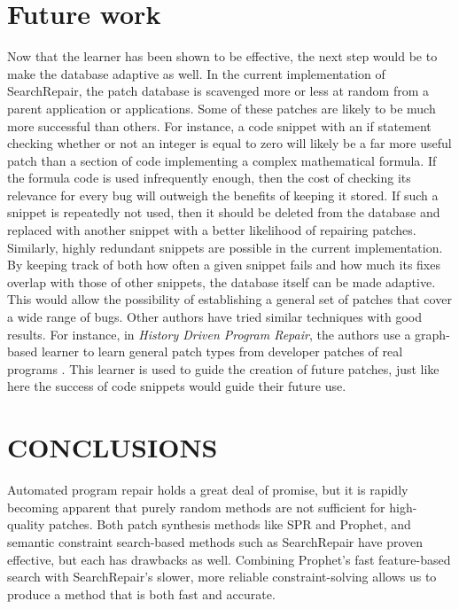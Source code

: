 \documentclass{paper}
\begin{document}
\section{Future work}

Now that the learner has been shown to be effective, the next step would be to make the database adaptive as well. 
In the current implementation of SearchRepair, the patch database is scavenged more or less at random from a parent application or applications. 
Some of these patches are likely to be much more successful than others. 
For instance, a code snippet with an if statement checking whether or not an integer is equal to zero will likely be a far more useful patch than a section of code implementing a complex mathematical formula. 
If the formula code is used infrequently enough, then the cost of checking its relevance for every bug will outweigh the benefits of keeping it stored. 
If such a snippet is repeatedly not used, then it should be deleted from the database and replaced with another snippet with a better likelihood of repairing patches. 
Similarly, highly redundant snippets are possible in the current implementation. 
By keeping track of both how often a given snippet fails and how much its fixes overlap with those of other snippets, the database itself can be made adaptive. 
This would allow the possibility of establishing a general set of patches that cover a wide range of bugs. 
Other authors have tried similar techniques with good results. 
For instance, in \textit{History Driven Program Repair}, the authors use a graph-based learner to learn general patch types from developer patches of real programs \cite{History Driven Program Repair}. 
This learner is used to guide the creation of future patches, just like here the success of code snippets would guide their future use. 


\section{CONCLUSIONS}

Automated program repair holds a great deal of promise, but it is rapidly becoming apparent that purely random methods are not sufficient for high-quality patches. 
Both patch synthesis methods like SPR and Prophet, and semantic constraint search-based methods such as SearchRepair have proven effective, but each has drawbacks as well. 
Combining Prophet's fast feature-based search with SearchRepair's slower, more reliable constraint-solving allows us to produce a method that is both fast and accurate. 
\end{document}
